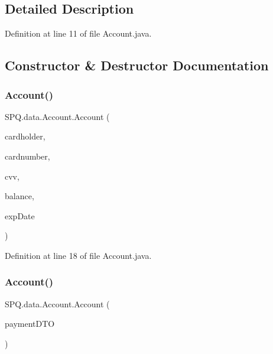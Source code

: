 \subsection{Detailed Description}


Definition at line 11 of file Account.\+java.



\subsection{Constructor \& Destructor Documentation}
\mbox{\label{class_s_p_q_1_1data_1_1_account_a11f422d8f96b08c185afde5c34e67f01}} 
\subsubsection{\texorpdfstring{Account()}{Account()}\hspace{0.1cm}{\footnotesize\ttfamily [1/2]}}
{\footnotesize\ttfamily S\+P\+Q.\+data.\+Account.\+Account (\begin{DoxyParamCaption}\item[{String}]{cardholder,  }\item[{long}]{cardnumber,  }\item[{int}]{cvv,  }\item[{double}]{balance,  }\item[{String}]{exp\+Date }\end{DoxyParamCaption})}



Definition at line 18 of file Account.\+java.

\mbox{\label{class_s_p_q_1_1data_1_1_account_a0d4661bfe533c8e38fc996747f3a4952}} 
\subsubsection{\texorpdfstring{Account()}{Account()}\hspace{0.1cm}{\footnotesize\ttfamily [2/2]}}
{\footnotesize\ttfamily S\+P\+Q.\+data.\+Account.\+Account (\begin{DoxyParamCaption}\item[{\mbox{\hyperlink{class_s_p_q_1_1dto_1_1_payment_d_t_o}{Payment\+D\+TO}}}]{payment\+D\+TO }\end{DoxyParamCaption})}



